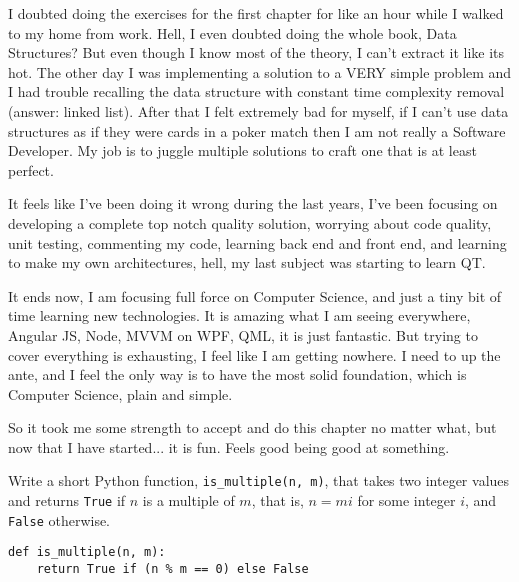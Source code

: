 
I doubted doing the exercises for the first chapter for like an hour while I walked to my home from work. Hell, I even doubted doing the whole book, Data Structures? But even though I know most of the theory, I can't extract it like its hot. The other day I was implementing a solution to a VERY simple problem and I had trouble recalling the data structure with constant time complexity removal (answer: linked list). After that I felt extremely bad for myself, if I can't use data structures as if they were cards in a poker match then I am not really a Software Developer. My job is to juggle multiple solutions to craft one that is at least perfect.

 \label{sec:reshaping}

It feels like I've been doing it wrong during the last years, I've been focusing on developing a complete top notch quality solution, worrying about code quality, unit testing, commenting my code, learning back end and front end, and learning to make my own architectures, hell, my last subject was starting to learn QT.

It ends now, I am focusing full force on Computer Science, and just a tiny bit of time learning new technologies. It is amazing what I am seeing everywhere, Angular JS, Node, MVVM on WPF, QML, it is just fantastic. But trying to cover everything is exhausting, I feel like I am getting nowhere. I need to up the ante, and I feel the only way is to have the most solid foundation, which is Computer Science, plain and simple.

\label{ssec:Exercises}

So it took me some strength to accept and do this chapter no matter what, but now that I have started... it is fun. Feels good being good at something. 

 \label{subsubsec:ex1_1}

Write a short Python function, \texttt{is_multiple(n, m)}, that takes two integer values and returns \texttt{True} if $n$ is a multiple of $m$, that is, $n = mi$ for some integer $i$, and \texttt{False} otherwise.

\begin{lstlisting}[label=ex1.1,caption=Exercise R-1.1]
def is_multiple(n, m):
    return True if (n % m == 0) else False
\end{lstlisting}